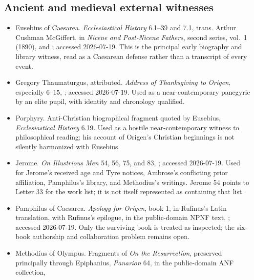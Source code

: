 \subsection{Ancient and medieval external witnesses}

\begin{itemize}
\item Eusebius of Caesarea. \emph{Ecclesiastical History} 6.1--39 and 7.1,
trans. Arthur Cushman McGiffert, in \emph{Nicene and Post-Nicene Fathers},
second series, vol.~1 (1890),
 and
; accessed
2026-07-19. This is the principal early biography and library witness, read as
a Caesarean defense rather than a transcript of every event.
\item Gregory Thaumaturgus, attributed. \emph{Address of Thanksgiving to
Origen}, especially 6--15,
; accessed 2026-07-19. Used as a near-contemporary panegyric by an
elite pupil, with identity and chronology qualified.
\item Porphyry. Anti-Christian biographical fragment quoted by Eusebius,
\emph{Ecclesiastical History} 6.19. Used as a hostile near-contemporary witness
to philosophical reading; his account of Origen's Christian beginnings is not
silently harmonized with Eusebius.
\item Jerome. \emph{On Illustrious Men} 54, 56, 75, and 83,
; accessed 2026-07-19. Used for Jerome's received age and Tyre
notices, Ambrose's conflicting prior affiliation, Pamphilus's library, and
Methodius's writings. Jerome 54 points to Letter 33 for the work list; it is not
itself represented as containing that list.
\item Pamphilus of Caesarea. \emph{Apology for Origen}, book 1, in Rufinus's
Latin translation, with Rufinus's epilogue, in the public-domain NPNF text,
;
accessed 2026-07-19. Only the surviving book is treated as inspected; the
six-book authorship and collaboration problem remains open.
\item Methodius of Olympus. Fragments of \emph{On the Resurrection}, preserved
principally through Epiphanius, \emph{Panarion} 64, in the public-domain ANF
collection,
\end{itemize}
